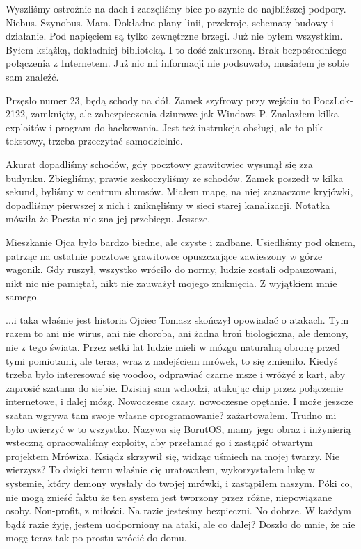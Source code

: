 Wyszliśmy ostrożnie na dach i zaczęliśmy biec po szynie do najbliższej podpory.
Niebus. Szynobus. Mam. Dokładne plany linii, przekroje, schematy budowy i działanie.
Pod napięciem są tylko zewnętrzne brzegi.
Już nie byłem wszystkim. Byłem książką, dokładniej biblioteką. I to dość zakurzoną.
Brak bezpośredniego połączenia z Internetem. Już nic mi informacji nie podsuwało, musiałem je sobie sam znaleźć.

Przęsło numer 23, będą schody na dół. Zamek szyfrowy przy wejściu to PoczLok-2122, zamknięty, ale zabezpieczenia dziurawe jak Windows P. 
Znalazłem kilka exploitów i program do hackowania. Jest też instrukcja obsługi, ale to plik tekstowy, trzeba przeczytać samodzielnie.

Akurat dopadliśmy schodów, gdy pocztowy grawitowiec wysunął się zza budynku. 
Zbiegliśmy, prawie zeskoczyliśmy ze schodów. Zamek poszedł w kilka sekund, byliśmy w centrum slumsów.
Miałem mapę, na niej zaznaczone kryjówki, dopadliśmy pierwszej z nich i zniknęliśmy w sieci starej kanalizacji.
Notatka mówiła że Poczta nie zna jej przebiegu. Jeszcze.

\divider{}

Mieszkanie Ojca było bardzo biedne, ale czyste i zadbane.
Usiedliśmy pod oknem, patrząc na ostatnie pocztowe grawitowce opuszczające zawieszony w górze wagonik.
Gdy ruszył, wszystko wróciło do normy, ludzie zostali odpauzowani, nikt nic nie pamiętał, nikt nie zauważył mojego zniknięcia.
Z wyjątkiem mnie samego.

\begin{dialogue}
\ds{} ...i taka właśnie jest historia \dm{} Ojciec Tomasz skończył opowiadać o atakach. \dm{}
Tym razem to ani nie wirus, ani nie choroba, ani żadna broń biologiczna, ale demony, nie z tego świata.
Przez setki lat ludzie mieli w mózgu naturalną obronę przed tymi pomiotami, ale teraz, wraz z nadejściem mrówek, to się zmieniło.
Kiedyś trzeba było interesować się voodoo, odprawiać czarne msze i wróżyć z kart, aby zaprosić szatana do siebie.
Dzisiaj sam wchodzi, atakując chip przez połączenie internetowe, i dalej mózg. Nowoczesne czasy, nowoczesne opętanie.
\ds{} I może jeszcze szatan wgrywa tam swoje własne oprogramowanie? \dm{} zażartowałem. Trudno mi było uwierzyć w to wszystko.
\ds{} Nazywa się BorutOS, mamy jego obraz i inżynierią wsteczną opracowaliśmy exploity, aby przełamać go i zastąpić otwartym projektem Mrówixa. \dm{}
Ksiądz skrzywił się, widząc uśmiech na mojej twarzy. \dm{} Nie wierzysz? To dzięki temu właśnie cię uratowałem, wykorzystałem lukę w systemie, który
demony wysłały do twojej mrówki, i zastąpiłem naszym. Póki co, nie mogą znieść faktu że ten system jest tworzony przez różne, niepowiązane osoby. Non-profit, z miłości.
Na razie jesteśmy bezpieczni.
\ds{} No dobrze. W każdym bądź razie żyję, jestem uodporniony na ataki, ale co dalej? \dm{} Doszło do mnie, że nie mogę teraz tak po prostu wrócić do domu.
\end{dialogue}

